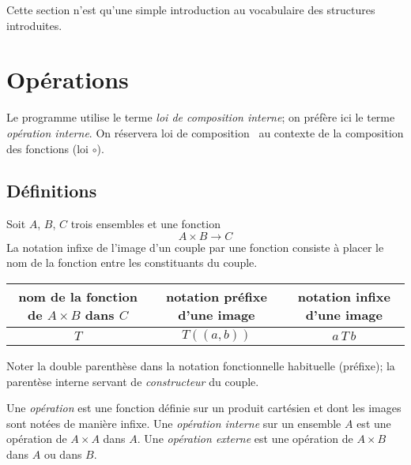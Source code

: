 

Cette section n'est qu'une simple introduction au vocabulaire des structures introduites.

\section{Opérations}
Le programme utilise le terme \emph{loi de composition interne}; on préfère ici le terme \emph{opération interne}. On réservera \og loi de composition\fg~ au contexte de la composition des fonctions (loi $\circ$).
\subsection{Définitions}
\begin{defi}
  Soit $A$, $B$, $C$ trois ensembles et une fonction
  \begin{displaymath}
    A\times B \longrightarrow C
  \end{displaymath}
La notation infixe de l'image  d'un couple par une fonction consiste à placer le nom de la fonction entre les constituants du couple.
\end{defi}
\begin{center}
\renewcommand{\arraystretch}{1.5}
\begin{tabular}{|c|c|c|} \hline
nom de la fonction de $A\times B$ dans $C$ & notation préfixe d'une image & notation infixe d'une image\\ \hline
$T$ & $T((a,b))$ & $a \,T \, b$ \\ \hline
\end{tabular}
\end{center}
Noter la double parenthèse dans la notation fonctionnelle habituelle (préfixe); la parentèse interne servant de \emph{constructeur} du couple.
\begin{defi}[opération]
Une \emph{opération} est une fonction définie sur un produit cartésien et dont les images sont notées de manière infixe.\newline
Une \emph{opération interne} sur un ensemble $A$ est une opération de $A\times A$ dans $A$. Une \emph{opération externe} est une opération de $A\times B$ dans $A$ ou dans $B$.
\end{defi}

